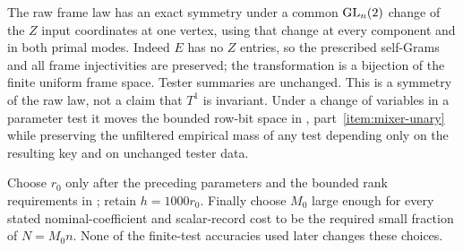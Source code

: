 \begin{remark}\label{rem:Z-reparametrization}
The raw frame law has an exact symmetry under a common
$\operatorname{GL}_n(2)$ change of the $Z$ input coordinates at one vertex,
using that change at every component and in both primal modes.
Indeed $E$ has no $Z$ entries, so the prescribed self-Grams and
all frame injectivities are preserved; the transformation is a
bijection of the finite uniform frame space.  Tester summaries
are unchanged.  This is a symmetry of the raw law, not a claim
that $T^1$ is invariant.  Under a change of variables in a
parameter test it moves the bounded row-bit space in
, part~\ref{item:mixer-unary} while preserving
the unfiltered empirical mass of any test depending only on the
resulting key and on unchanged tester data.
\end{remark}

Choose $r_0$ only after the preceding parameters and the bounded
rank requirements in ; retain
$h=1000r_0$.  Finally choose $M_0$ large enough for every stated
nominal-coefficient and scalar-record cost to be the required
small fraction of $N=M_0n$.  None of the finite-test accuracies
used later changes these choices.
